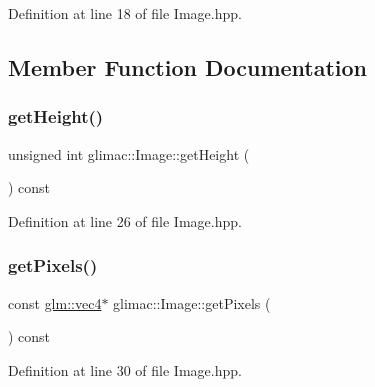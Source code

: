 Definition at line 18 of file Image.\+hpp.



\subsection{Member Function Documentation}
\mbox{\label{classglimac_1_1_image_a0a2afce624e3df2b12d7d76ba0d31c42}} 
\subsubsection{\texorpdfstring{get\+Height()}{getHeight()}}
{\footnotesize\ttfamily unsigned int glimac\+::\+Image\+::get\+Height (\begin{DoxyParamCaption}{ }\end{DoxyParamCaption}) const\hspace{0.3cm}{\ttfamily [inline]}}



Definition at line 26 of file Image.\+hpp.

\mbox{\label{classglimac_1_1_image_af2cdd4b884831808f5ecba70209c2f95}} 
\subsubsection{\texorpdfstring{get\+Pixels()}{getPixels()}\hspace{0.1cm}{\footnotesize\ttfamily [1/2]}}
{\footnotesize\ttfamily const \hyperlink{group__core__types_ga5881b1b022d7fd1b7218f5916532dd02}{glm\+::vec4}$\ast$ glimac\+::\+Image\+::get\+Pixels (\begin{DoxyParamCaption}{ }\end{DoxyParamCaption}) const\hspace{0.3cm}{\ttfamily [inline]}}



Definition at line 30 of file Image.\+hpp.

\mbox{\label{classglimac_1_1_image_a679f8ae515ad9607faa762e1e2105285}} 
